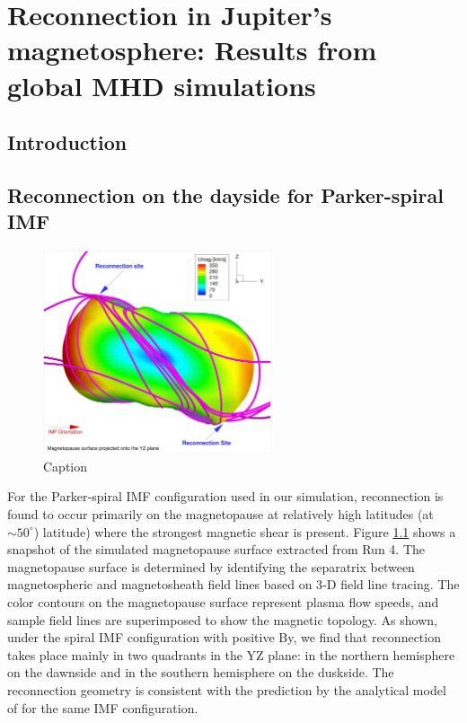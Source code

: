 \chapter{Reconnection in Jupiter's magnetosphere: Results from global MHD simulations}

\section{Introduction}

\section{Reconnection on the dayside for Parker-spiral IMF}

\begin{figure}
    \centering
    \includegraphics[width=0.6\textwidth]{images4/reconnection-dayside.jpg}
    \caption{Caption}
    \label{fig:reconnection-dayside}
\end{figure}

For the Parker‐spiral IMF configuration used in our simulation, reconnection is found to occur primarily on the magnetopause at relatively high latitudes (at $\sim50^\circ$) latitude) where the strongest magnetic shear is present. Figure \ref{fig:reconnection-dayside} shows a snapshot of the simulated magnetopause surface extracted from Run 4. The magnetopause surface is determined by identifying the separatrix between magnetospheric and magnetosheath field lines based on 3‐D field line tracing. The color contours on the magnetopause surface represent plasma flow speeds, and sample field lines are superimposed to show the magnetic topology. As shown, under the spiral IMF configuration with positive By, we find that reconnection takes place mainly in two quadrants in the YZ plane: in the northern hemisphere on the dawnside and in the southern hemisphere on the duskside. The reconnection geometry is consistent with the prediction by the analytical model of \cite{Masters2017} for the same IMF configuration.

